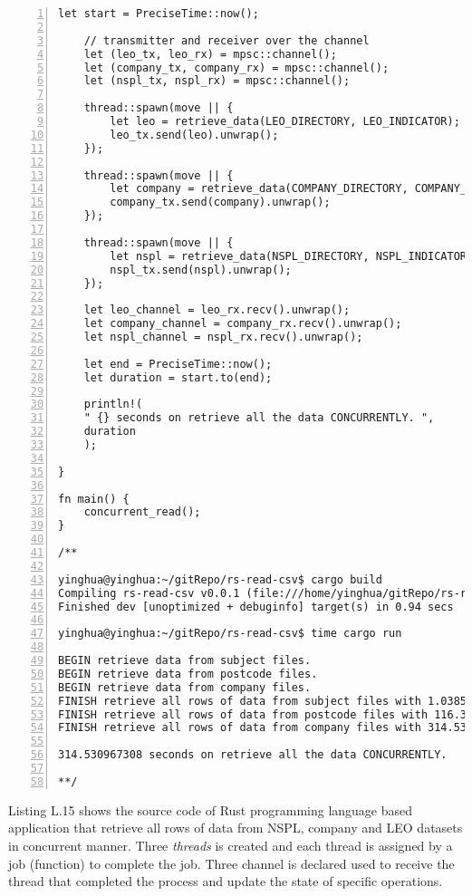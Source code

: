 \begin{lstlisting}[breaklines, frame=single, numbers=left, caption={Rust concurrent program source codes. (main.rs)}, label=commandline-02]
	let start = PreciseTime::now();
	
	// transmitter and receiver over the channel
	let (leo_tx, leo_rx) = mpsc::channel();
	let (company_tx, company_rx) = mpsc::channel();
	let (nspl_tx, nspl_rx) = mpsc::channel();
	
	thread::spawn(move || {
		let leo = retrieve_data(LEO_DIRECTORY, LEO_INDICATOR);
		leo_tx.send(leo).unwrap();
	});
	
	thread::spawn(move || {
		let company = retrieve_data(COMPANY_DIRECTORY, COMPANY_INDICATOR);
		company_tx.send(company).unwrap();
	});
	
	thread::spawn(move || {
		let nspl = retrieve_data(NSPL_DIRECTORY, NSPL_INDICATOR);
		nspl_tx.send(nspl).unwrap();
	});
	
	let leo_channel = leo_rx.recv().unwrap();
	let company_channel = company_rx.recv().unwrap();
	let nspl_channel = nspl_rx.recv().unwrap();
	
	let end = PreciseTime::now();
	let duration = start.to(end);
	
	println!(
	" {} seconds on retrieve all the data CONCURRENTLY. ",
	duration
	);

}

fn main() {
	concurrent_read();
}

/** 

yinghua@yinghua:~/gitRepo/rs-read-csv$ cargo build 
Compiling rs-read-csv v0.0.1 (file:///home/yinghua/gitRepo/rs-read-csv)
Finished dev [unoptimized + debuginfo] target(s) in 0.94 secs

yinghua@yinghua:~/gitRepo/rs-read-csv$ time cargo run 

BEGIN retrieve data from subject files. 
BEGIN retrieve data from postcode files. 
BEGIN retrieve data from company files. 
FINISH retrieve all rows of data from subject files with 1.038585794 seconds.
FINISH retrieve all rows of data from postcode files with 116.362977683 seconds.
FINISH retrieve all rows of data from company files with 314.530471492 seconds.

314.530967308 seconds on retrieve all the data CONCURRENTLY. 

**/ 

\end{lstlisting}

Listing L.15 shows the source code of Rust programming language based application that retrieve all rows of data from NSPL, company and LEO datasets in concurrent manner. Three \textit{threads} is created and each thread is assigned by a job (function) to complete the job. Three channel is declared used to receive the thread that completed the process and update the state of specific operations. 

